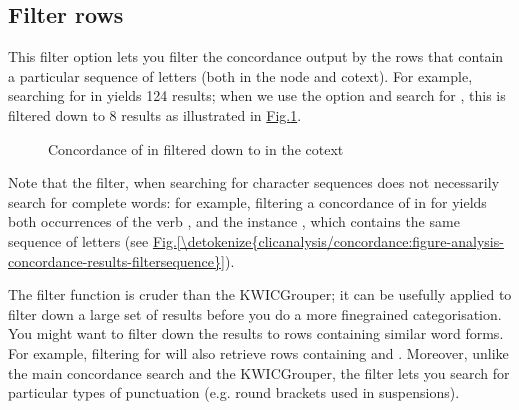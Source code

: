 \documentclass[letterpaper,10pt,english]{sphinxmanual}
\begin{document}
\subsection{Filter rows}
\label{\detokenize{clicanalysis/concordance:filter-rows}}
\sphinxAtStartPar
This filter option lets you filter the concordance output by the rows
that contain a particular sequence of letters (both in the node and
co\sphinxhyphen{}text). For example, searching for  in  yields 124
results; when we use the option  and search for
, this is filtered down to 8 results as illustrated in \hyperref[\detokenize{clicanalysis/concordance:figure-analysis-concordance-results-filter}]{Fig.\@ \ref{\detokenize{clicanalysis/concordance:figure-analysis-concordance-results-filter}}}.

\begin{figure}[htbp]
\centering
\capstart

\noindent{}
\caption{Concordance of  in  filtered down to
 in the co\sphinxhyphen{}text}\label{\detokenize{clicanalysis/concordance:id10}}\label{\detokenize{clicanalysis/concordance:figure-analysis-concordance-results-filter}}\end{figure}

\sphinxAtStartPar
Note that the filter, when searching for character sequences does not
necessarily search for complete words: for example, filtering a
concordance of  in  for  yields both
occurrences of the verb , and the instance , which
contains the same sequence of letters (see \hyperref[\detokenize{clicanalysis/concordance:figure-analysis-concordance-results-filtersequence}]{Fig.\@ \ref{\detokenize{clicanalysis/concordance:figure-analysis-concordance-results-filtersequence}}}).

\sphinxAtStartPar
The filter function is cruder than the KWICGrouper; it can be usefully
applied to filter down a large set of results before you do a more
fine\sphinxhyphen{}grained categorisation. You might want to filter down the results
to rows containing similar word forms. For example, filtering for 
will also retrieve rows containing  and . Moreover,
unlike the main concordance search and the KWICGrouper, the filter lets
you search for particular types of punctuation (e.g. round brackets used
in suspensions).
\end{document}
